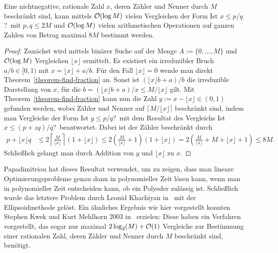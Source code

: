 \begin{theorem}\label{theorem-find-rational}
	Eine nichtnegative, rationale Zahl $x$, deren Zähler und Nenner durch $M$ beschränkt sind, kann mittels $\mathcal{O}(\log M)$ vielen Vergleichen der Form \glqq Ist $x\leq p/q$?\grqq\ mit $p,q\leq 2M$ und $\mathcal{O}(\log M)$ vielen arithmetischen Operationen auf ganzen Zahlen von Betrag maximal $8M$ bestimmt werden.
\end{theorem}
\begin{proof}
	\newcommand{\lowx}{\lfloor x \rfloor}
	Zunächst wird mittels binärer Suche auf der Menge $A:=\{0,\dots, M\}$ und $\mathcal{O}(\log M)$ Vergleichen $\lowx$ ermittelt.
	Es existiert ein irreduzibler Bruch $a/b\in[0,1)$ mit $x=\lowx + a/b$.
	Für den Fall $\lowx = 0$ wende man direkt Theorem~\ref{theorem-find-fraction} an.
	Sonst ist $(\lowx b + a)/b$ die irreduzible Darstellung von $x$, für die $b = (\lowx b+a)/x \leq M/\lowx$ gilt.
	Mit Theorem~\ref{theorem-find-fraction} kann nun die Zahl $y:=x-\lowx\in(0,1)$ gefunden werden, wobei Zähler und Nenner auf $\lceil M/\lowx \rceil$ beschränkt sind, indem man Vergleiche der Form \glqq Ist $y\leq p/q$?\grqq\ mit dem Resultat des Vergleichs \glqq Ist $x\leq (p + zq)/q$?\grqq\ beantwortet.
	Dabei ist der Zähler beschränkt durch \begin{align*}
	p+\lowx q &\leq 2 \left\lceil \frac{M}{\lowx} \right\rceil (1+\lowx) \leq 2 \left(\frac{M}{\lowx} + 1\right)(1+\lowx)
	= 2\left(\frac{M}{\lowx} + M + \lowx + 1\right) \leq 8M.
	\end{align*}
	Schließlich gelangt man durch Addition von $y$ und $\lowx$ zu $x$.
\end{proof}

Papadimitriou hat dieses Resultat verwendet, um zu zeigen, dass man lineare Optimierungsprobleme genau dann in polynomieller Zeit lösen kann, wenn man in polynomieller Zeit entscheiden kann, ob ein Polyeder zulässig ist.
Schließlich wurde das letztere Problem durch Leonid Khachiyan in~\cite{Kha79} mit der Ellipsoidmethode gelöst.
Ein ähnliches Ergebnis wie hier vorgestellt konnten Stephen Kwek und Kurt Mehlhorn 2003 in~\cite{Kwek:2003} erzielen:
Diese haben ein Verfahren vorgestellt, das sogar nur maximal $2\log_2(M) + \mathcal{O}(1)$ Vergleiche zur Bestimmung einer rationalen Zahl, deren Zähler und Nenner durch $M$ beschränkt sind, benötigt.